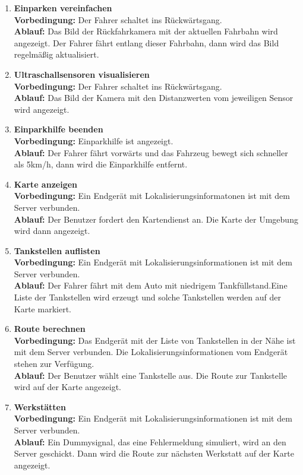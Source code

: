 \documentclass[pflichtenheft.tex]{subfiles}
\begin{document}
\begin{enumerate}
\item{\textbf{Einparken vereinfachen}} \\
\textbf{Vorbedingung: } Der Fahrer schaltet ins Rückwärtsgang. \\
\textbf{Ablauf: } Das Bild der Rückfahrkamera mit der aktuellen
Fahrbahn wird angezeigt. Der Fahrer fährt entlang dieser Fahrbahn, dann wird das
Bild regelmäßig aktualisiert.

\item{\textbf{Ultraschallsensoren visualisieren}} \\
\textbf{Vorbedingung: } Der Fahrer schaltet ins Rückwärtsgang. \\
\textbf{Ablauf: } Das Bild der Kamera mit den Distanzwerten vom jeweiligen
Sensor wird angezeigt.

\item{\textbf{Einparkhilfe beenden}} \\
\textbf{Vorbedingung: } Einparkhilfe ist angezeigt. \\
\textbf{Ablauf: } Der Fahrer fährt vorwärts und das Fahrzeug bewegt sich
schneller als 5km/h, dann wird die Einparkhilfe entfernt.


\item{\textbf{Karte anzeigen}} \\
\textbf{Vorbedingung: } Ein Endgerät mit Lokalisierungsinformatonen ist mit dem
Server verbunden.\\
\textbf{Ablauf: } Der Benutzer fordert den Kartendienst an. Die Karte der
Umgebung wird dann angezeigt.

\item{\textbf{Tankstellen auflisten}} \\
\textbf{Vorbedingung: } Ein Endgerät mit Lokalisierungsinformationen ist mit dem
Server verbunden.\\
\textbf{Ablauf: } Der Fahrer fährt mit dem Auto mit niedrigem Tankfüllstand.Eine
Liste der Tankstellen wird erzeugt und solche Tankstellen werden auf der
Karte markiert. 

\item{\textbf{Route berechnen}} \\
\textbf{Vorbedingung: } Das Endgerät mit der Liste von Tankstellen in der Nähe
ist mit dem Server verbunden. Die Lokalisierungsinformationen vom Endgerät
stehen zur Verfügung.\\
\textbf{Ablauf: } Der Benutzer wählt eine Tankstelle aus. Die Route zur
Tankstelle wird auf der Karte angezeigt.

\item{\textbf{Werkstätten}} \\
\textbf{Vorbedingung: } Ein Endgerät mit Lokalisierungsinformationen ist mit dem
Server verbunden. \\
\textbf{Ablauf: } Ein Dummysignal, das eine Fehlermeldung simuliert, wird
an den Server geschickt. Dann wird die Route zur nächsten Werkstatt auf der
Karte angezeigt.



\end{enumerate}
\end{document}
